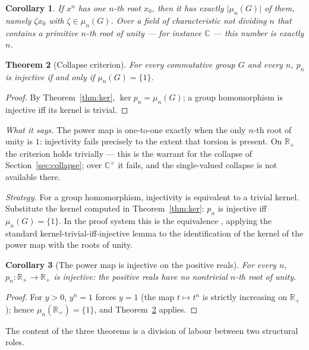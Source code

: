 \documentclass[submission,noinfoline]{jsfds}
\newtheorem{theorem}{Theorem}
\newtheorem{corollary}[theorem]{Corollary}
\newcommand{\Lean}[1]{}
\newcommand{\abs}[1]{\lvert #1\rvert}
\begin{document}
\begin{corollary}\label{cor:branches}
If $x^n$ has one $n$-th root $x_0$, then it has exactly
$\abs{\mu_n(G)}$ of them, namely $\zeta x_0$ with $\zeta\in\mu_n(G)$.
Over a field of characteristic not dividing $n$ that contains a
primitive $n$-th root of unity --- for instance $\mathbb C$ --- this
number is exactly $n$.
\end{corollary}

\begin{theorem}[Collapse criterion]\label{thm:collapse}
For every commutative group $G$ and every $n$,
$p_n$ is injective if and only if $\mu_n(G)=\{1\}$.
\end{theorem}
\begin{proof}
By Theorem~\ref{thm:ker}, $\ker p_n=\mu_n(G)$; a group homomorphism is
injective iff its kernel is trivial. \Lean{powMap\_injective\_iff\_nRoots\_trivial}
\end{proof}

\textit{What it says.} The power map is one-to-one exactly when the only
$n$-th root of unity is $1$: injectivity fails precisely to the extent
that torsion is present. On $\mathbb R_+$ the criterion holds trivially
--- this is the warrant for the collapse of
Section~\ref{sec:collapse}; over $\mathbb C^\times$ it fails, and the
single-valued collapse is not available there.

\textit{Strategy.} For a group homomorphism, injectivity is equivalent
to a trivial kernel. Substitute the kernel computed in
Theorem~\ref{thm:ker}: $p_n$ is injective iff $\mu_n(G)=\{1\}$. In the
proof system this is the equivalence
\Lean{powMap\_injective\_iff\_nRoots\_trivial}, applying the standard
kernel-trivial-iff-injective lemma to the identification of the kernel
of the power map with the roots of unity.

\begin{corollary}[The power map is injective on the positive reals]\label{cor:p-inj-Rpos}
For every $n$, $p_n\colon\mathbb R_+\to\mathbb R_+$ is injective: the
positive reals have no nontrivial $n$-th root of unity.
\end{corollary}
\begin{proof}
For $y>0$, $y^n=1$ forces $y=1$ (the map $t\mapsto t^n$ is strictly
increasing on $\mathbb R_+$); hence $\mu_n(\mathbb R_+)=\{1\}$, and
Theorem~\ref{thm:collapse} applies. \Lean{pow\_inj\_on\_Rpos}
\end{proof}

The content of the three theorems is a division of labour between two
structural roles.
\end{document}
